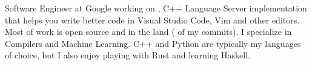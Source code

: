 
\begin{cvparagraph}
  Software Engineer at Google working on
  , C++ Language Server implementation
  that helps you write better code in Visual Studio Code, Vim and other
  editors. Most of work is open source and in the
   land
  (
  of my commits). I specialize in Compilers and Machine Learning. C++ and
  Python are typically my languages of choice, but I also enjoy playing with
  Rust and learning Haskell.
\end{cvparagraph}
